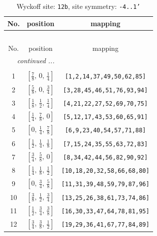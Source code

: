 \documentclass[fleqn,8pt]{jsarticle}
\begin{document}
\renewcommand{\arraystretch}{1.2}
\begin{longtable}{ccc}
\caption{Wyckoff site: {\tt 12b}, site symmetry: {\tt -4..1'}}
 \\
 \hline \hline
No. & position & mapping \\ \hline \endfirsthead

\multicolumn{2}{l}{\tablename\ \thetable{}} \\
 \hline \hline
No. & position & mapping \\ \hline \endhead

 \hline \hline
\multicolumn{2}{r}{\footnotesize\it continued ...} \\ \endfoot

 \hline \hline
\multicolumn{2}{r}{} \\ \endlastfoot

1 & $\left[ \frac{7}{8},\, 0,\, \frac{1}{4} \right]$ & {\tt [1,2,14,37,49,50,62,85]} \\ \hline
2 & $\left[ \frac{5}{8},\, 0,\, \frac{3}{4} \right]$ & {\tt [3,28,45,46,51,76,93,94]} \\ \hline
3 & $\left[ \frac{1}{8},\, \frac{1}{2},\, \frac{1}{4} \right]$ & {\tt [4,21,22,27,52,69,70,75]} \\ \hline
4 & $\left[ \frac{1}{4},\, \frac{7}{8},\, 0 \right]$ & {\tt [5,12,17,43,53,60,65,91]} \\ \hline
5 & $\left[ 0,\, \frac{1}{4},\, \frac{7}{8} \right]$ & {\tt [6,9,23,40,54,57,71,88]} \\ \hline
6 & $\left[ \frac{1}{2},\, \frac{1}{4},\, \frac{1}{8} \right]$ & {\tt [7,15,24,35,55,63,72,83]} \\ \hline
7 & $\left[ \frac{3}{4},\, \frac{5}{8},\, 0 \right]$ & {\tt [8,34,42,44,56,82,90,92]} \\ \hline
8 & $\left[ \frac{1}{4},\, \frac{1}{8},\, \frac{1}{2} \right]$ & {\tt [10,18,20,32,58,66,68,80]} \\ \hline
9 & $\left[ 0,\, \frac{3}{4},\, \frac{5}{8} \right]$ & {\tt [11,31,39,48,59,79,87,96]} \\ \hline
10 & $\left[ \frac{3}{8},\, \frac{1}{2},\, \frac{3}{4} \right]$ & {\tt [13,25,26,38,61,73,74,86]} \\ \hline
11 & $\left[ \frac{1}{2},\, \frac{3}{4},\, \frac{3}{8} \right]$ & {\tt [16,30,33,47,64,78,81,95]} \\ \hline
12 & $\left[ \frac{3}{4},\, \frac{3}{8},\, \frac{1}{2} \right]$ & {\tt [19,29,36,41,67,77,84,89]} \\
\end{longtable}
\end{document}
